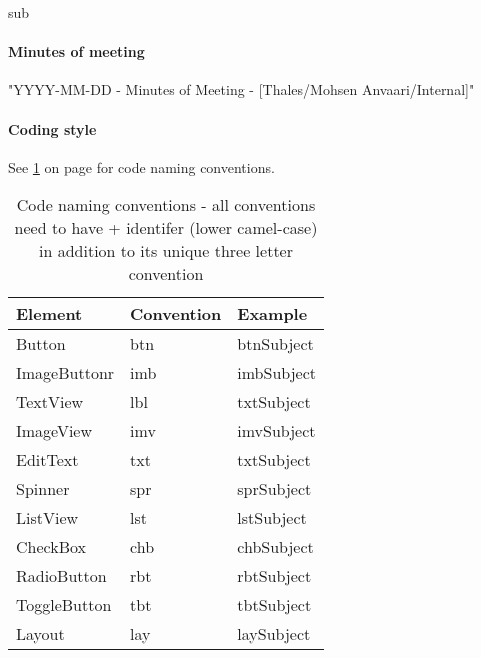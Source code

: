 sub\paragraph{Minutes of meeting}\hfill
\newline
"YYYY-MM-DD - Minutes of Meeting - [Thales/Mohsen Anvaari/Internal]"

\paragraph{Coding style}
See \ref{tab:namingconventions} on page \pageref{tab:namingconventions} for code naming conventions.
\begin{table}
\begin{tabular}{l|l|l}
\textbf{Element} & \textbf{Convention} & \textbf{Example} \\ \hline \hline
Button & btn & btnSubject \\ \hline
ImageButtonr & imb & imbSubject \\ \hline
TextView & lbl & txtSubject \\ \hline
ImageView & imv & imvSubject \\ \hline
EditText & txt & txtSubject \\ \hline
Spinner & spr & sprSubject \\ \hline
ListView & lst & lstSubject \\ \hline
CheckBox & chb & chbSubject \\ \hline
RadioButton & rbt & rbtSubject \\ \hline
ToggleButton & tbt & tbtSubject \\ \hline
Layout & lay & laySubject 
\end{tabular}
\caption{Code naming conventions - all conventions need to have + identifer (lower camel-case) in addition to its unique three letter convention }\label{tab:namingconventions}
\end{table}
